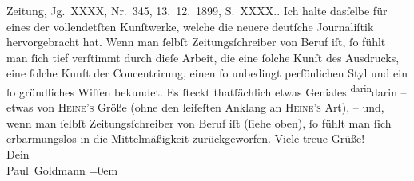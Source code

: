 \begin{ledgroupsized}[t]{13cm}
{{{{                        Zeitung}, Jg. XXXX, Nr. 345, 13. 12. 1899, S. XXXX.}}}\label{K_L02899-1h}. Ich halte dasſelbe für eines der
               vollendetſten Kunſtwerke, welche die neuere deutſche Journaliſtik hervorgebracht hat.
               Wenn man ſelbſt Zeitungsſchreiber von Beruf iſt, ſo fühlt man ſich tief verſtimmt
               durch  dieſe Arbeit, die eine ſolche Kunſt des
               Ausdrucks, eine ſolche Kunft der Concentrirung, einen ſo unbedingt perſönlichen Styl
               und ein ſo gründliches Wiſſen bekundet. Es ſteckt thatſächlich etwas Geniales \substVorne{}\textsuperscript{darin}\substDazwischen{}darin\substHinten{} – {\pb}etwas von \textsc{Heine’s} Größe (ohne den leiſeſten
               Anklang an \textsc{Heine’s} Art), – und, wenn man ſelbſt
               Zeitungsſchreiber von Beruf iſt (ſiehe oben), ſo fühlt man ſich erbarmungslos in die
               Mittelmäßigkeit zurückgeworfen.\pend
           \pstart
           Viele treue Grüße! {\\[\baselineskip]}Dein {\\[\baselineskip]}\spacefill\mbox{Paul Goldmann}\pend
           \leftskip=0em{}
         
         \endnumbering{}\end{ledgroupsized}\begin{anhang}\end{anhang}\newcommand{\dateiname}{L02899}\newcommand{\titel}{Paul Goldmann an Arthur Schnitzler, 13. 12. [1899]}\newcommand{\editorInnen}{Martin Anton Müller und Laura Untner}
      